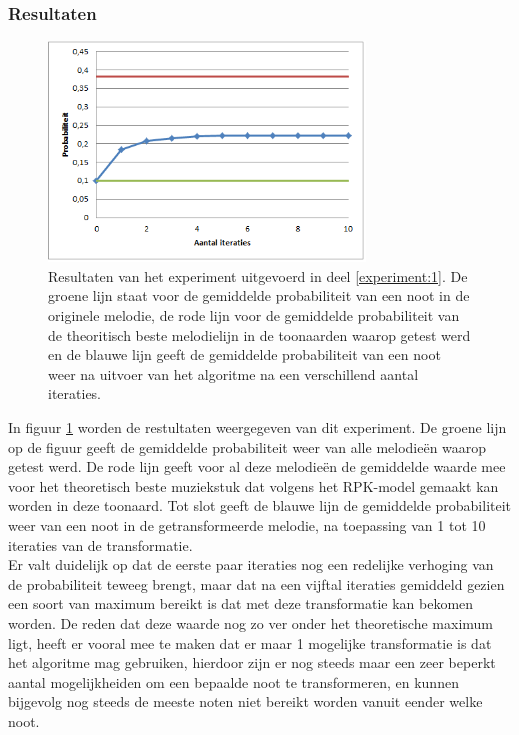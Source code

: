 \subsubsection{Resultaten}
\begin{figure}[!ht]
  \centering
  \includegraphics[width=0.75\textwidth]{5_Experimenten_Resultaten/exp1_res}
  \caption{Resultaten van het experiment uitgevoerd in deel \ref{experiment:1}. De groene lijn staat voor de gemiddelde probabiliteit van een noot in de originele melodie, de rode lijn voor de gemiddelde probabiliteit van de theoritisch beste melodielijn in de toonaarden waarop getest werd en de blauwe lijn geeft de gemiddelde probabiliteit van een noot weer na uitvoer van het algoritme na een verschillend aantal iteraties.}
  \label{figuur:exp1}
\end{figure}

In figuur \ref{figuur:exp1} worden de restultaten weergegeven van dit experiment. De groene lijn op de figuur geeft de gemiddelde probabiliteit weer van alle melodie\"en waarop getest werd. De rode lijn geeft voor al deze melodie\"en de gemiddelde waarde mee voor het theoretisch beste muziekstuk dat volgens het RPK-model gemaakt kan worden in deze toonaard. Tot slot geeft de blauwe lijn de gemiddelde probabiliteit weer van een noot in de getransformeerde melodie, na toepassing van 1 tot 10 iteraties van de transformatie.\\
Er valt duidelijk op dat de eerste paar iteraties nog een redelijke verhoging van de probabiliteit teweeg brengt, maar dat na een vijftal iteraties gemiddeld gezien een soort van maximum bereikt is dat met deze transformatie kan bekomen worden. De reden dat deze waarde nog zo ver onder het theoretische maximum ligt, heeft er vooral mee te maken dat er maar 1 mogelijke transformatie is dat het algoritme mag gebruiken, hierdoor zijn er nog steeds maar een zeer beperkt aantal mogelijkheiden om een bepaalde noot te transformeren, en kunnen bijgevolg nog steeds de meeste noten niet bereikt worden vanuit eender welke noot.


